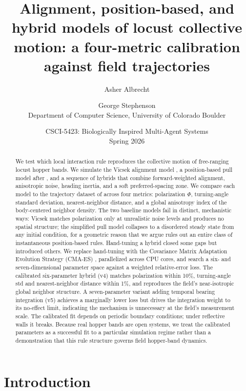 \documentclass[11pt]{article}
\title{Alignment, position-based, and hybrid models of locust collective
motion: a four-metric calibration against field trajectories}
\author{Asher Albrecht \and George Stephenson \\
Department of Computer Science, University of Colorado Boulder}
\date{CSCI-5423: Biologically Inspired Multi-Agent Systems \\ Spring 2026}
\begin{document}
\maketitle

\begin{abstract}
We test which local interaction rule reproduces the collective motion of
free-ranging locust hopper bands. We simulate the Vicsek alignment model
\citep{vicsek1995}, a position-based pull model after \citet{sayin2025},
and a sequence of hybrids that combine forward-weighted alignment,
anisotropic noise, heading inertia, and a soft preferred-spacing zone. We
compare each model to the trajectory dataset of \citet{weinburd2024}
across four metrics: polarization $\Phi$, turning-angle standard deviation,
nearest-neighbor distance, and a global anisotropy index of the
body-centered neighbor density. The two baseline models fail in distinct,
mechanistic ways: Vicsek matches polarization only at unrealistic noise
levels and produces no spatial structure; the simplified pull model
collapses to a disordered steady state from any initial condition, for a
geometric reason that we argue rules out an entire class of instantaneous
position-based rules. Hand-tuning a hybrid closed some gaps but introduced
others. We replace hand-tuning with the Covariance Matrix Adaptation
Evolution Strategy (CMA-ES) \citep{hansen2016}, parallelized across CPU
cores, and search a six- and seven-dimensional parameter space against a
weighted relative-error loss. The calibrated six-parameter hybrid (v4)
matches polarization within 10\%, turning-angle std and nearest-neighbor
distance within 1\%, and reproduces the field's near-isotropic global
neighbor structure. A seven-parameter variant adding temporal bearing
integration (v5) achieves a marginally lower loss but drives the
integration weight to its no-effect limit, indicating the mechanism is
unnecessary at the field's measurement scale. The calibrated fit depends
on periodic boundary conditions; under reflective walls it breaks. Because
real hopper bands are open systems, we treat the calibrated parameters as
a successful fit to a particular simulation regime rather than a
demonstration that this rule structure governs field hopper-band dynamics.
\end{abstract}

\section{Introduction}
\end{document}
